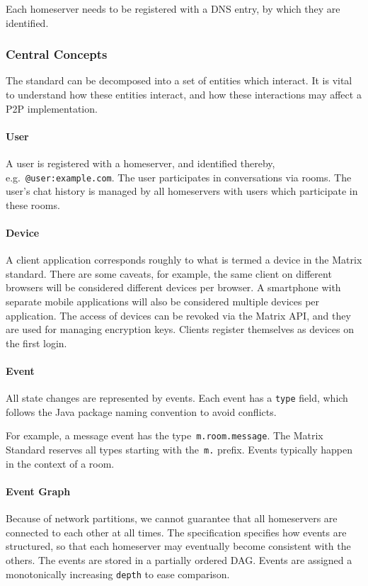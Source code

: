 Each homeserver needs to be registered with a \ac{DNS} entry, by which they are identified.

\subsubsection{Central Concepts}
The standard can be decomposed into a set of entities which interact.
It is vital to understand how these entities interact, and how these interactions may affect a \ac{P2P} implementation.

\paragraph{User}
A user is registered with a homeserver, and identified thereby, e.g.~\texttt{@user:example.com}.
The user participates in conversations via rooms.
The user's chat history is managed by all homeservers with users which participate in these rooms.

\paragraph{Device}
A client application corresponds roughly to what is termed a device in the Matrix standard.
There are some caveats, for example, the same client on different browsers will be considered different devices per browser.
A smartphone with separate mobile applications will also be considered multiple devices per application.
The access of devices can be revoked via the Matrix \ac{API}, and they are used for managing encryption keys.
Clients register themselves as devices on the first login.

\paragraph{Event}
All state changes are represented by events.
Each event has a \texttt{type} field, which follows the Java package naming convention to avoid conflicts.

For example, a message event has the type~\texttt{m.room.message}.
The Matrix Standard reserves all types starting with the~\texttt{m.} prefix.
Events typically happen in the context of a room.

\paragraph{Event Graph}
Because of network partitions, we cannot guarantee that all homeservers are connected to each other at all times.
The specification specifies how events are structured, so that each homeserver may eventually become consistent with the others.
The events are stored in a partially ordered \ac{DAG}.
Events are assigned a monotonically increasing \texttt{depth} to ease comparison.

